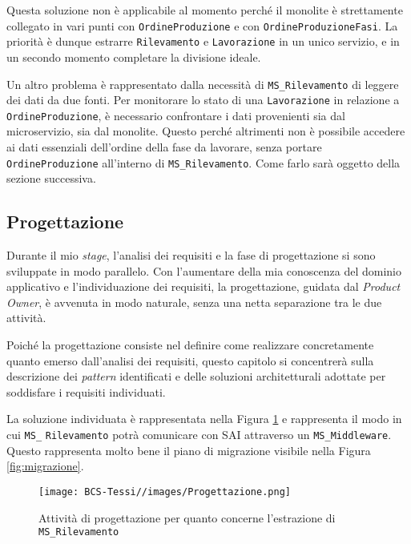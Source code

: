         \vspace{0.2 em}
        \noindent Questa soluzione non è applicabile al momento perché il monolite è strettamente collegato in vari punti con \texttt{OrdineProduzione} e con \texttt{OrdineProduzioneFasi}. La priorità è dunque estrarre \texttt{Rilevamento} e \texttt{Lavorazione} in un unico servizio, e in un secondo momento completare la divisione ideale.

        \vspace{0.2 em}
        \noindent Un altro problema è rappresentato dalla necessità di \texttt{MS\_Rilevamento} di leggere dei dati da due fonti. Per monitorare lo stato di una \texttt{Lavorazione} in relazione a \texttt{OrdineProduzione}, è necessario confrontare i dati provenienti sia dal microservizio, sia dal monolite. Questo perché altrimenti non è possibile accedere ai dati essenziali dell'ordine della fase da lavorare, senza portare \texttt{OrdineProduzione} all'interno di \texttt{MS\_Rilevamento}. Come farlo sarà oggetto della sezione successiva. 

        \subsection{Progettazione}
        Durante il mio \textit{stage}, l’analisi dei requisiti e la fase di progettazione si sono sviluppate in modo parallelo. Con l’aumentare della mia conoscenza del dominio applicativo e l’individuazione dei requisiti, la progettazione, guidata dal \textit{Product Owner}, è avvenuta in modo naturale, senza una netta separazione tra le due attività.  

        \vspace{0.2 em}
        \noindent Poiché la progettazione consiste nel definire come realizzare concretamente quanto emerso dall’analisi dei requisiti, questo capitolo si concentrerà sulla descrizione dei \textit{pattern} identificati e delle soluzioni architetturali adottate per soddisfare i requisiti individuati.

        \vspace{0.2 em}
        \noindent La soluzione individuata è rappresentata nella Figura \ref{fig:progettazione} e rappresenta il modo in cui \texttt{MS\_} \texttt{Rilevamento} potrà comunicare con SAI attraverso un \texttt{MS\_Middleware}. Questo rappresenta molto bene il piano di migrazione visibile nella Figura \ref{fig:migrazione}.
        
        \begin{figure}
            \centering
            \texttt{[image: BCS-Tessi//images/Progettazione.png]}
            \caption[Progettazione per l'estrazione del microservizio]{Attività di progettazione per quanto concerne l'estrazione di \texttt{MS\_Rilevamento}}
            \label{fig:progettazione}
        \end{figure}

